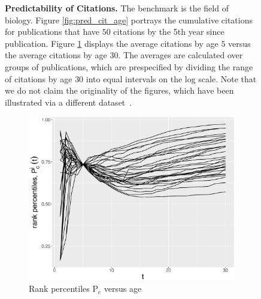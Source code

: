\begin{figure}[ht!]
\begin{subfigure}[b]{0.48\textwidth}
     \label{fig:pred_cit_cit}
    \end{subfigure}
    \caption{{\bf Predictability of Citations.}
    The benchmark is the field of biology. Figure \ref{fig:pred_cit_age} portrays the cumulative citations for publications that have $50$ citations by the 5th year since publication. Figure \ref{fig:pred_cit_cit} displays the average citations by age $5$ versus the average citations by age $30$. The averages are calculated over groups of publications, which are prespecified by dividing the range of citations by age $30$ into equal intervals on the log scale. Note that we do not claim the originality of the figures, which have been illustrated via a different dataset~\cite{Wang2013}.}
    \label{fig:pub_cit_pred}
\end{figure}


\begin{figure}[ht!]
    \centering
    \begin{subfigure}[b]{0.495\textwidth}
     \centering
     \includegraphics[width=\textwidth]{figures/pred_power/rp_t.eps}
     \caption{Rank percentiles P$_c$ versus age}
     \label{fig:pred_rp_age}
    \end{subfigure}
    \hfill
    \begin{subfigure}[b]{0.495\textwidth}
     \centering

\end{subfigure}
\end{figure}
